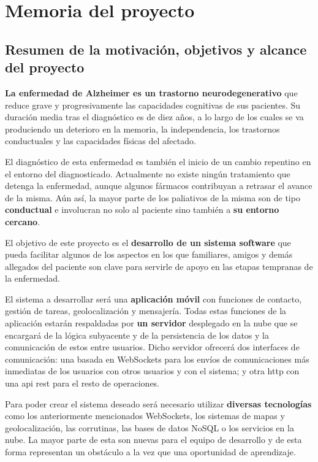 \chapter{Memoria del proyecto}
\label{chap:memoria}

\section{Resumen de la motivación, objetivos y alcance del proyecto}

\textbf{La enfermedad de Alzheimer es un trastorno neurodegenerativo} que reduce grave y progresivamente las capacidades cognitivas de sus pacientes. Su duración media tras el diagnóstico es de diez años, a lo largo de los cuales se va produciendo un deterioro en la memoria, la independencia, los trastornos conductuales y las capacidades físicas del afectado.

El diagnóstico de esta enfermedad es también el inicio de un cambio repentino en el entorno del diagnosticado. Actualmente no existe ningún tratamiento que detenga la enfermedad, aunque algunos fármacos contribuyan a retrasar el avance de la misma. Aún así, la mayor parte de los paliativos de la misma son de tipo \textbf{conductual} e involucran no solo al paciente sino también a \textbf{su entorno cercano}.

El objetivo de este proyecto es el \textbf{desarrollo de un sistema software} que pueda facilitar algunos de los aspectos en los que familiares, amigos y demás allegados del paciente son clave para servirle de apoyo en las etapas tempranas de la enfermedad.

El sistema a desarrollar será una \textbf{aplicación móvil} con funciones de contacto, gestión de tareas, geolocalización y mensajería. Todas estas funciones de la aplicación estarán respaldadas por \textbf{un servidor} desplegado en la nube que se encargará de la lógica subyacente y de la persistencia de los datos y la comunicación de estos entre usuarios. Dicho servidor ofrecerá dos interfaces de comunicación: una basada en WebSockets para los envíos de comunicaciones más inmediatas de los usuarios con otros usuarios y con el sistema; y otra \acrshort{http} con una \acrshort{api} \acrshort{rest} para el resto de operaciones.

Para poder crear el sistema deseado será necesario utilizar \textbf{diversas tecnologías} como los anteriormente mencionados WebSockets, los sistemas de mapas y geolocalización, las corrutinas, las bases de datos NoSQL o los servicios en la nube. La mayor parte de esta son nuevas para el equipo de desarrollo y de esta forma representan un obstáculo a la vez que una oportunidad de aprendizaje.

